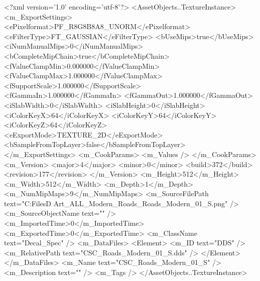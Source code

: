 <?xml version='1.0' encoding='utf-8'?>
<AssetObjects..TextureInstance>
  <m_ExportSettings>
    <ePixelformat>PF_R8G8B8A8_UNORM</ePixelformat>
    <eFilterType>FT_GAUSSIAN</eFilterType>
    <bUseMips>true</bUseMips>
    <iNumManualMips>0</iNumManualMips>
    <bCompleteMipChain>true</bCompleteMipChain>
    <fValueClampMin>0.000000</fValueClampMin>
    <fValueClampMax>1.000000</fValueClampMax>
    <fSupportScale>1.000000</fSupportScale>
    <fGammaIn>1.000000</fGammaIn>
    <fGammaOut>1.000000</fGammaOut>
    <iSlabWidth>0</iSlabWidth>
    <iSlabHeight>0</iSlabHeight>
    <iColorKeyX>64</iColorKeyX>
    <iColorKeyY>64</iColorKeyY>
    <iColorKeyZ>64</iColorKeyZ>
    <eExportMode>TEXTURE_2D</eExportMode>
    <bSampleFromTopLayer>false</bSampleFromTopLayer>
  </m_ExportSettings>
  <m_CookParams>
    <m_Values />
  </m_CookParams>
  <m_Version>
    <major>4</major>
    <minor>0</minor>
    <build>372</build>
    <revision>177</revision>
  </m_Version>
  <m_Height>512</m_Height>
  <m_Width>512</m_Width>
  <m_Depth>1</m_Depth>
  <m_NumMipMaps>9</m_NumMipMaps>
  <m_SourceFilePath text="C:\Users\Shadow\Desktop\Working Files\3D Art\Decals\CSC_ALL_Modern_Roads\textures\CSC_Roads_Modern_01_S.png" />
  <m_SourceObjectName text="" />
  <m_ImportedTime>0</m_ImportedTime>
  <m_ExportedTime>0</m_ExportedTime>
  <m_ClassName text="Decal_Spec" />
  <m_DataFiles>
    <Element>
      <m_ID text="DDS" />
      <m_RelativePath text="CSC_Roads_Modern_01_S.dds" />
    </Element>
  </m_DataFiles>
  <m_Name text="CSC_Roads_Modern_01_S" />
  <m_Description text="" />
  <m_Tags />
</AssetObjects..TextureInstance>